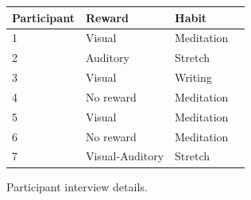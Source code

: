 \begin{figure}[H] %
\begin{center}
\begin{tabular}{ |p{3cm}|p{2.8cm}|p{3cm}|p{2cm}| }
 \hline
 \textbf{Participant} & \textbf{Reward} & \textbf{Habit} \\ \hline
 1 & Visual & Meditation \\ \hline
 2 & Auditory & Stretch \\ \hline
 3 & Visual & Writing \\ \hline
 4 & No reward & Meditation \\ \hline
 5 & Visual & Meditation \\ \hline
 6 & No reward & Meditation \\ \hline
 7 & Visual-Auditory & Stretch \\ \hline
\end{tabular}
\end{center}
    \caption{Participant interview details.}
    \label{fig:interview_details}

\end{figure}

